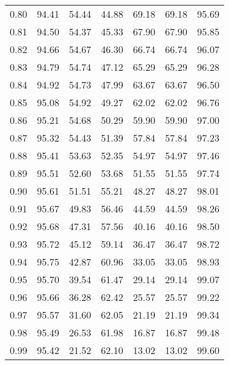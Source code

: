 \begin{tabular}{|c|c|c|c|c|c|c|}
      0.80 &     94.41 &     54.44 &      44.88 &   69.18 &      69.18 &         95.69 \\
      0.81 &     94.50 &     54.37 &      45.33 &   67.90 &      67.90 &         95.85 \\
      0.82 &     94.66 &     54.67 &      46.30 &   66.74 &      66.74 &         96.07 \\
      0.83 &     94.79 &     54.74 &      47.12 &   65.29 &      65.29 &         96.28 \\
      0.84 &     94.92 &     54.73 &      47.99 &   63.67 &      63.67 &         96.50 \\
      0.85 &     95.08 &     54.92 &      49.27 &   62.02 &      62.02 &         96.76 \\
      0.86 &     95.21 &     54.68 &      50.29 &   59.90 &      59.90 &         97.00 \\
      0.87 &     95.32 &     54.43 &      51.39 &   57.84 &      57.84 &         97.23 \\
      0.88 &     95.41 &     53.63 &      52.35 &   54.97 &      54.97 &         97.46 \\
      0.89 &     95.51 &     52.60 &      53.68 &   51.55 &      51.55 &         97.74 \\
      0.90 &     95.61 &     51.51 &      55.21 &   48.27 &      48.27 &         98.01 \\
      0.91 &     95.67 &     49.83 &      56.46 &   44.59 &      44.59 &         98.26 \\
      0.92 &     95.68 &     47.31 &      57.56 &   40.16 &      40.16 &         98.50 \\
      0.93 &     95.72 &     45.12 &      59.14 &   36.47 &      36.47 &         98.72 \\
      0.94 &     95.75 &     42.87 &      60.96 &   33.05 &      33.05 &         98.93 \\
      0.95 &     95.70 &     39.54 &      61.47 &   29.14 &      29.14 &         99.07 \\
      0.96 &     95.66 &     36.28 &      62.42 &   25.57 &      25.57 &         99.22 \\
      0.97 &     95.57 &     31.60 &      62.05 &   21.19 &      21.19 &         99.34 \\
      0.98 &     95.49 &     26.53 &      61.98 &   16.87 &      16.87 &         99.48 \\
      0.99 &     95.42 &     21.52 &      62.10 &   13.02 &      13.02 &         99.60 \\
\bottomrule
\end{tabular}
